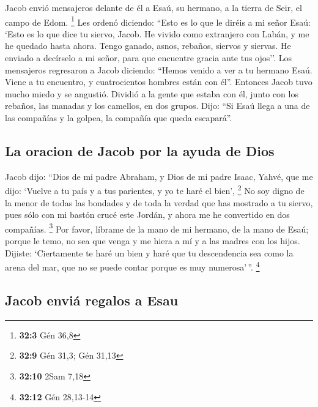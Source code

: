  Jacob envió mensajeros delante de él a Esaú, su hermano,
a la tierra de Seir, el campo de Edom. \footnote{\textbf{32:3} Gén 36,8}
 Les ordenó diciendo: ``Esto es lo que le diréis a mi
señor Esaú: `Esto es lo que dice tu siervo, Jacob. He vivido como
extranjero con Labán, y me he quedado hasta ahora.  Tengo
ganado, asnos, rebaños, siervos y siervas. He enviado a decírselo a mi
señor, para que encuentre gracia ante tus ojos''.  Los
mensajeros regresaron a Jacob diciendo: ``Hemos venido a ver a tu
hermano Esaú. Viene a tu encuentro, y cuatrocientos hombres están con
él''.  Entonces Jacob tuvo mucho miedo y se angustió.
Dividió a la gente que estaba con él, junto con los rebaños, las manadas
y los camellos, en dos grupos.  Dijo: ``Si Esaú llega a
una de las compañías y la golpea, la compañía que queda escapará''.

\hypertarget{la-oracion-de-jacob-por-la-ayuda-de-dios}{%
\subsection{La oracion de Jacob por la ayuda de
Dios}\label{la-oracion-de-jacob-por-la-ayuda-de-dios}}

 Jacob dijo: ``Dios de mi padre Abraham, y Dios de mi
padre Isaac, Yahvé, que me dijo: `Vuelve a tu país y a tus parientes, y
yo te haré el bien', \footnote{\textbf{32:9} Gén 31,3; Gén 31,13}
 No soy digno de la menor de todas las bondades y de toda
la verdad que has mostrado a tu siervo, pues sólo con mi bastón crucé
este Jordán, y ahora me he convertido en dos compañías. \footnote{\textbf{32:10}
  2Sam 7,18}  Por favor, líbrame de la mano de mi
hermano, de la mano de Esaú; porque le temo, no sea que venga y me hiera
a mí y a las madres con los hijos.  Dijiste: `Ciertamente
te haré un bien y haré que tu descendencia sea como la arena del mar,
que no se puede contar porque es muy numerosa'\,''. \footnote{\textbf{32:12}
  Gén 28,13-14}

\hypertarget{jacob-enviuxe1-regalos-a-esau}{%
\subsection{Jacob enviá regalos a
Esau}\label{jacob-enviuxe1-regalos-a-esau}}

